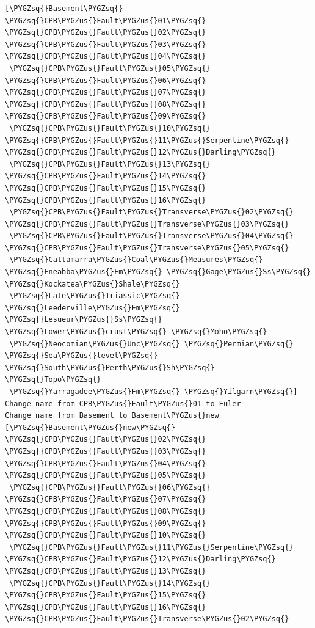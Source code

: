 \documentclass[letterpaper,10pt,english]{sphinxmanual}
\def\PYGZus{\char`\_}
\def\PYGZsq{\char`\'}
\begin{document}
\begin{Verbatim}[commandchars=\\\{\}]
[\PYGZsq{}Basement\PYGZsq{} \PYGZsq{}CPB\PYGZus{}Fault\PYGZus{}01\PYGZsq{} \PYGZsq{}CPB\PYGZus{}Fault\PYGZus{}02\PYGZsq{} \PYGZsq{}CPB\PYGZus{}Fault\PYGZus{}03\PYGZsq{} \PYGZsq{}CPB\PYGZus{}Fault\PYGZus{}04\PYGZsq{}
 \PYGZsq{}CPB\PYGZus{}Fault\PYGZus{}05\PYGZsq{} \PYGZsq{}CPB\PYGZus{}Fault\PYGZus{}06\PYGZsq{} \PYGZsq{}CPB\PYGZus{}Fault\PYGZus{}07\PYGZsq{} \PYGZsq{}CPB\PYGZus{}Fault\PYGZus{}08\PYGZsq{} \PYGZsq{}CPB\PYGZus{}Fault\PYGZus{}09\PYGZsq{}
 \PYGZsq{}CPB\PYGZus{}Fault\PYGZus{}10\PYGZsq{} \PYGZsq{}CPB\PYGZus{}Fault\PYGZus{}11\PYGZus{}Serpentine\PYGZsq{} \PYGZsq{}CPB\PYGZus{}Fault\PYGZus{}12\PYGZus{}Darling\PYGZsq{}
 \PYGZsq{}CPB\PYGZus{}Fault\PYGZus{}13\PYGZsq{} \PYGZsq{}CPB\PYGZus{}Fault\PYGZus{}14\PYGZsq{} \PYGZsq{}CPB\PYGZus{}Fault\PYGZus{}15\PYGZsq{} \PYGZsq{}CPB\PYGZus{}Fault\PYGZus{}16\PYGZsq{}
 \PYGZsq{}CPB\PYGZus{}Fault\PYGZus{}Transverse\PYGZus{}02\PYGZsq{} \PYGZsq{}CPB\PYGZus{}Fault\PYGZus{}Transverse\PYGZus{}03\PYGZsq{}
 \PYGZsq{}CPB\PYGZus{}Fault\PYGZus{}Transverse\PYGZus{}04\PYGZsq{} \PYGZsq{}CPB\PYGZus{}Fault\PYGZus{}Transverse\PYGZus{}05\PYGZsq{}
 \PYGZsq{}Cattamarra\PYGZus{}Coal\PYGZus{}Measures\PYGZsq{} \PYGZsq{}Eneabba\PYGZus{}Fm\PYGZsq{} \PYGZsq{}Gage\PYGZus{}Ss\PYGZsq{} \PYGZsq{}Kockatea\PYGZus{}Shale\PYGZsq{}
 \PYGZsq{}Late\PYGZus{}Triassic\PYGZsq{} \PYGZsq{}Leederville\PYGZus{}Fm\PYGZsq{} \PYGZsq{}Lesueur\PYGZus{}Ss\PYGZsq{} \PYGZsq{}Lower\PYGZus{}crust\PYGZsq{} \PYGZsq{}Moho\PYGZsq{}
 \PYGZsq{}Neocomian\PYGZus{}Unc\PYGZsq{} \PYGZsq{}Permian\PYGZsq{} \PYGZsq{}Sea\PYGZus{}level\PYGZsq{} \PYGZsq{}South\PYGZus{}Perth\PYGZus{}Sh\PYGZsq{} \PYGZsq{}Topo\PYGZsq{}
 \PYGZsq{}Yarragadee\PYGZus{}Fm\PYGZsq{} \PYGZsq{}Yilgarn\PYGZsq{}]
Change name from CPB\PYGZus{}Fault\PYGZus{}01 to Euler
Change name from Basement to Basement\PYGZus{}new
[\PYGZsq{}Basement\PYGZus{}new\PYGZsq{} \PYGZsq{}CPB\PYGZus{}Fault\PYGZus{}02\PYGZsq{} \PYGZsq{}CPB\PYGZus{}Fault\PYGZus{}03\PYGZsq{} \PYGZsq{}CPB\PYGZus{}Fault\PYGZus{}04\PYGZsq{} \PYGZsq{}CPB\PYGZus{}Fault\PYGZus{}05\PYGZsq{}
 \PYGZsq{}CPB\PYGZus{}Fault\PYGZus{}06\PYGZsq{} \PYGZsq{}CPB\PYGZus{}Fault\PYGZus{}07\PYGZsq{} \PYGZsq{}CPB\PYGZus{}Fault\PYGZus{}08\PYGZsq{} \PYGZsq{}CPB\PYGZus{}Fault\PYGZus{}09\PYGZsq{} \PYGZsq{}CPB\PYGZus{}Fault\PYGZus{}10\PYGZsq{}
 \PYGZsq{}CPB\PYGZus{}Fault\PYGZus{}11\PYGZus{}Serpentine\PYGZsq{} \PYGZsq{}CPB\PYGZus{}Fault\PYGZus{}12\PYGZus{}Darling\PYGZsq{} \PYGZsq{}CPB\PYGZus{}Fault\PYGZus{}13\PYGZsq{}
 \PYGZsq{}CPB\PYGZus{}Fault\PYGZus{}14\PYGZsq{} \PYGZsq{}CPB\PYGZus{}Fault\PYGZus{}15\PYGZsq{} \PYGZsq{}CPB\PYGZus{}Fault\PYGZus{}16\PYGZsq{} \PYGZsq{}CPB\PYGZus{}Fault\PYGZus{}Transverse\PYGZus{}02\PYGZsq{}

\end{Verbatim}
\end{document}
